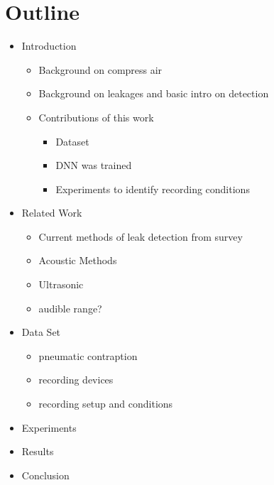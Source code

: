\section{Outline}
\begin{itemize}
\item Introduction
\begin{itemize}
\item Background on compress air
\item Background on leakages and basic intro on detection
\item Contributions of this work
\begin{itemize}
\item Dataset 
\item DNN was trained
\item Experiments to identify recording conditions
\end{itemize}
\end{itemize}
\item Related Work
\begin{itemize}
\item Current methods of leak detection from survey
\item Acoustic Methods
\item Ultrasonic
\item audible range?
\end{itemize}
\item Data Set
\begin{itemize}
\item pneumatic contraption
\item recording devices
\item recording setup and conditions
\end{itemize}
\item Experiments
\item Results
\item Conclusion
\end{itemize}
